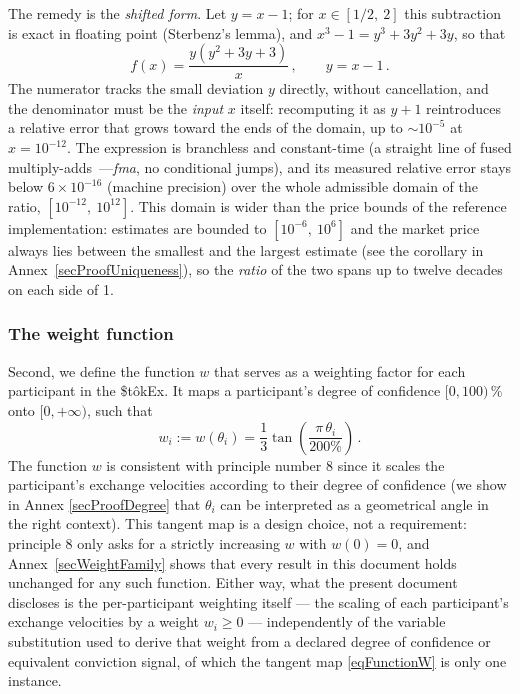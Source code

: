 \documentclass[letterpaper]{article}
\newcommand{\StokEx}{\$t\^{o}kEx}
\begin{document}
The remedy is the \emph{shifted form}. Let $y = x - 1$; for $x \in [1/2,\ 2]$ this subtraction is exact in floating point (Sterbenz's lemma), and $x^3 - 1 = y^3 + 3y^2 + 3y$, so that
\begin{equation}
    f(x) = \frac{y\left(y^2 + 3y + 3\right)}{x}\,, \qquad y = x - 1\,. \label{eqShiftedForm}
\end{equation}
The numerator tracks the small deviation $y$ directly, without cancellation, and the denominator must be the \emph{input} $x$ itself: recomputing it as $y + 1$ reintroduces a relative error that grows toward the ends of the domain, up to $\sim 10^{-5}$ at $x = 10^{-12}$.
The expression is branchless and constant-time (a straight line of fused multiply-adds~---\emph{fma}, no conditional jumps), and its measured relative error stays below $6 \times 10^{-16}$ (machine precision) over the whole admissible domain of the ratio, $[10^{-12},\ 10^{12}]$.
This domain is wider than the price bounds of the reference implementation: estimates are bounded to $[10^{-6},\ 10^{6}]$ and the market price always lies between the smallest and the largest estimate (see the corollary in Annex~\ref{secProofUniqueness}),
so the \emph{ratio} of the two spans up to twelve decades on each side of 1.


\subsubsection{The weight function}

Second, we define the function $w$ that serves as a weighting factor for each participant in the \StokEx{}. It maps a participant's degree of confidence $[0, 100)\,\%$ onto $[0,+\infty)$, such that
\begin{equation}
    w_i := w\left(\theta_i\right) = \frac{1}{3}\tan \left( \frac{\pi \,\theta_i}{200\%}\right)\,. \label{eqFunctionW}
\end{equation}
The function $w$ is consistent with principle number 8 since it scales the participant's exchange velocities according to their degree of confidence (we show in Annex \ref{secProofDegree} that $\theta_i$ can be interpreted as a geometrical angle in the right context).
This tangent map is a design choice, not a requirement: principle 8 only asks for a strictly increasing $w$ with $w(0) = 0$, and Annex~\ref{secWeightFamily} shows that every result in this document holds unchanged for any such function.
Either way, what the present document discloses is the per-participant weighting itself --- the scaling of each participant's exchange velocities by a weight $w_i \geq 0$ --- independently of the variable substitution used to derive that weight from a declared degree of confidence or equivalent conviction signal, of which the tangent map \eqref{eqFunctionW} is only one instance.
\end{document}
